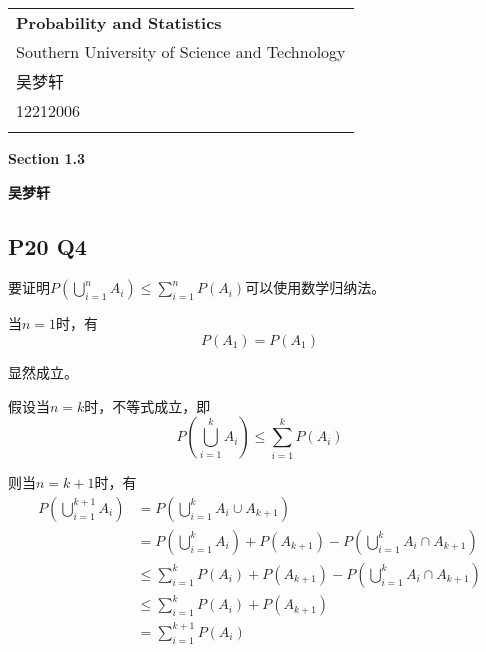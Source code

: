 \documentclass[a4paper,12pt]{ctexart}
\begin{document}
\thispagestyle{empty} %

\begin{tabular}{p{15.5cm}}
{\large \bf Probability and Statistics} \\
Southern University of Science and Technology \\ 吴梦轩 \\ 12212006 \\
\hline
\\
\end{tabular}

\vspace*{0.3cm} %

\begin{center}
	{\Large \bf Section 1.3}
	\vspace{2mm}

	{\bf 吴梦轩}
		
\end{center}  

\vspace{0.4cm}

\subsection*{P20 Q4}
要证明$P \left( \bigcup_{i=1}^n A_i \right) \le \sum_{i=1}^n P(A_i)$可以使用数学归纳法。

当$n=1$时，有
\begin{equation*}
	P(A_1) = P(A_1)
\end{equation*}

显然成立。

假设当$n=k$时，不等式成立，即
\begin{equation*}
	P \left( \bigcup_{i=1}^k A_i \right) \le \sum_{i=1}^k P(A_i)
\end{equation*}

则当$n=k+1$时，有
\begin{align*}
	P \left( \bigcup_{i=1}^{k+1} A_i\right)
	&= P \left( \bigcup_{i=1}^k A_i \cup A_{k+1} \right)\\
	&= P \left( \bigcup_{i=1}^k A_i \right) + P(A_{k+1}) - P \left( \bigcup_{i=1}^k A_i \cap A_{k+1} \right)\\
	&\le \sum_{i=1}^k P(A_i) + P(A_{k+1}) - P \left( \bigcup_{i=1}^k A_i \cap A_{k+1} \right)\\
	&\le \sum_{i=1}^k P(A_i) + P(A_{k+1})\\
	&= \sum_{i=1}^{k+1} P(A_i)
\end{align*}
\end{document}
